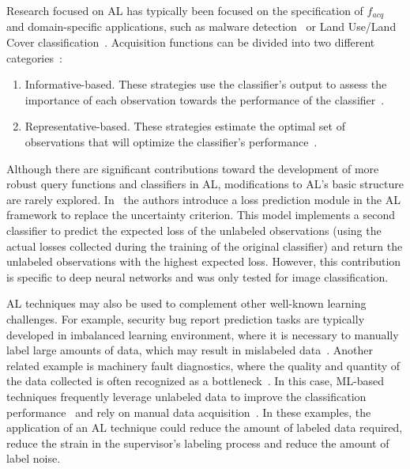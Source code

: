 Research focused on AL has typically been focused on the specification of
$f_{acq}$~\cite{hospedales2011finding} and domain-specific applications, such
as malware detection~\cite{li2022boosting} or Land Use/Land Cover
classification~\cite{li2020label}. Acquisition functions can be divided into
two different categories~\cite{su2021cost, Kumar2020}: 

\begin{enumerate}

    \item Informative-based. These strategies use the classifier's output to
        assess the importance of each observation towards the performance of
        the classifier~\cite{Fu2013}.

    \item Representative-based. These strategies estimate the optimal set of
        observations that will optimize the classifier's
        performance~\cite{Kumar2020}.

\end{enumerate}

Although there are significant contributions toward the development of more
robust query functions and classifiers in AL, modifications to AL's basic
structure are rarely explored. In~\cite{Yoo2019} the authors introduce a loss
prediction module in the AL framework to replace the uncertainty criterion.
This model implements a second classifier to predict the expected loss of the
unlabeled observations (using the actual losses collected during the training
of the original classifier) and return the unlabeled observations with the
highest expected loss. However, this contribution is specific to deep neural
networks and was only tested for image classification.



AL techniques may also be used to complement other well-known learning
challenges. For example, security bug report prediction tasks are typically
developed in imbalanced learning environment, where it is necessary to
manually label large amounts of data, which may result in mislabeled
data~\cite{wu2021data}. Another related example is machinery fault
diagnostics, where the quality and quantity of the data collected is often
recognized as a bottleneck~\cite{zhang2023blockchain}. In this case,
ML-based techniques frequently leverage unlabeled data to improve the
classification performance~\cite{zhang2021open} and rely on manual data
acquisition~\cite{he2017deep}. In these examples, the application of an
AL technique could reduce the amount of labeled data required, reduce the
strain in the supervisor's labeling process and reduce the amount of label
noise. 

